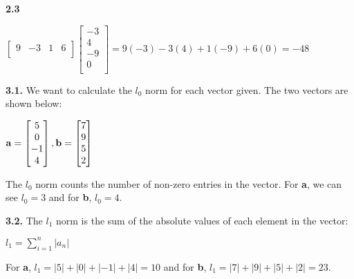 \documentclass[12pt]{article}
\begin{document}
{\bf 2.3} 

\begin{center}
$
\begin{bmatrix}
9 & -3 & 1 & 6\\
\end{bmatrix}
\begin{bmatrix}
-3\\
4\\
-9\\
0\\
\end{bmatrix}=
9(-3)-3(4)+1(-9)+6(0)=-48
$
\end{center}

{\bf 3.1.} We want to calculate the $l_{0}$ norm for each vector given. The two vectors are shown below:

\begin{center}
$
{\bf a}=
\begin{bmatrix}
5\\
0\\
-1\\
4\\
\end{bmatrix}, {\bf b}=
\begin{bmatrix}

7\\
9\\
5\\
2\\
\end{bmatrix}
$\\
\end{center}

The $l_{0}$ norm counts the number of non-zero entries in the vector. For {\bf a}, we can see $l_{0}=3$ and for {\bf b}, $l_{0}=4$. 

{\bf 3.2.} The $l_{1}$ norm is the sum of the absolute values of each element in the vector:

\begin{center}

$l_{1}=\sum_{i=1}^{n}|a_{n}|$\\

\end{center}

For {\bf a}, $l_{1}=|5|+|0|+|-1|+|4|=10$ and for {\bf b}, $l_{1}=|7|+|9|+|5|+|2|=23$.
\end{document}
